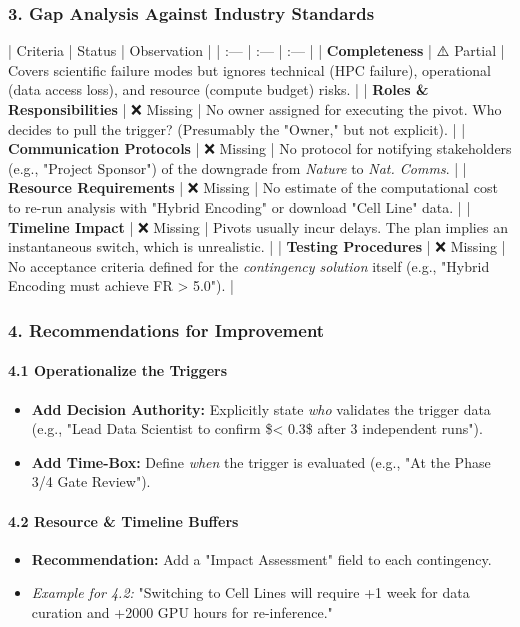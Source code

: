 \documentclass{article}
\begin{document}
\subsubsection{3. Gap Analysis Against Industry Standards}

| Criteria | Status | Observation |
| :--- | :--- | :--- |
| \textbf{Completeness} | ⚠️ Partial | Covers scientific failure modes but ignores technical (HPC failure), operational (data access loss), and resource (compute budget) risks. |
| \textbf{Roles \& Responsibilities} | ❌ Missing | No owner assigned for executing the pivot. Who decides to pull the trigger? (Presumably the "Owner," but not explicit). |
| \textbf{Communication Protocols} | ❌ Missing | No protocol for notifying stakeholders (e.g., "Project Sponsor") of the downgrade from \textit{Nature} to \textit{Nat. Comms}. |
| \textbf{Resource Requirements} | ❌ Missing | No estimate of the computational cost to re-run analysis with "Hybrid Encoding" or download "Cell Line" data. |
| \textbf{Timeline Impact} | ❌ Missing | Pivots usually incur delays. The plan implies an instantaneous switch, which is unrealistic. |
| \textbf{Testing Procedures} | ❌ Missing | No acceptance criteria defined for the \textit{contingency solution} itself (e.g., "Hybrid Encoding must achieve FR > 5.0"). |

\subsubsection{4. Recommendations for Improvement}

\paragraph{4.1 Operationalize the Triggers}
\begin{itemize}
\item   \textbf{Add Decision Authority:} Explicitly state \textit{who} validates the trigger data (e.g., "Lead Data Scientist to confirm \$\rho < 0.3\$ after 3 independent runs").
\item   \textbf{Add Time-Box:} Define \textit{when} the trigger is evaluated (e.g., "At the Phase 3/4 Gate Review").
\end{itemize}

\paragraph{4.2 Resource \& Timeline Buffers}
\begin{itemize}
\item   \textbf{Recommendation:} Add a "Impact Assessment" field to each contingency.
\item   \textit{Example for 4.2:} "Switching to Cell Lines will require +1 week for data curation and +2000 GPU hours for re-inference."
\end{itemize}
\end{document}
